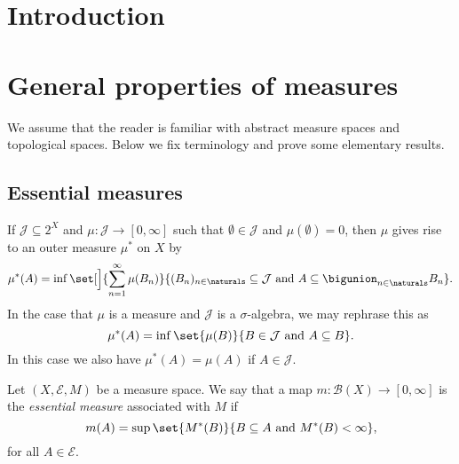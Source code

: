 \documentclass[article, a4paper, 11pt, oneside]{memoir}
\title{\doctitle}
\author{\docauthor}
\numberwithin{equation}{chapter}
\newcommand{\calB}{\mathcal{B}}
\newcommand{\calE}{\mathcal{E}}
\newcommand{\borel}[1]{\calB(#1)}
\begin{document}
\maketitle

\chapter{Introduction}


\chapter{General properties of measures}

We assume that the reader is familiar with abstract measure spaces and topological spaces. Below we fix terminology and prove some elementary results.


\section{Essential measures}

\newcommand{\calJ}{\mathcal{J}}
\newcommand{\powerset}[1]{2^{#1}}

If $\calJ \subseteq \powerset{X}$ and $\mu \colon \calJ \to [0,\infty]$ such that $\emptyset \in \calJ$ and $\mu(\emptyset) = 0$, then $\mu$ gives rise to an outer measure $\mu^*$ on $X$ by
%
\begin{equation*}
    \mu^*(A)
        = \inf \set[\Big]{
            \sum_{n=1}^\infty \mu(B_n)
        }{
            (B_n)_{n \in \naturals} \subseteq \calJ
            \text{ and }
            A \subseteq \bigunion_{n \in \naturals} B_n
        }.
\end{equation*}
%
In the case that $\mu$ is a measure and $\calJ$ is a $\sigma$-algebra, we may rephrase this as
%
\begin{equation*}
    \mu^*(A)
        = \inf \set{
            \mu(B)
        }{
            B \in \calJ
            \text{ and }
            A \subseteq B
        }.
\end{equation*}
%
In this case we also have $\mu^*(A) = \mu(A)$ if $A \in \calJ$.

\begin{definition}
    Let $(X, \calE, M)$ be a measure space. We say that a map $m \colon \borel{X} \to [0,\infty]$ is the \emph{essential measure} associated with $M$ if
    \begin{equation*}
        m(A)
            = \sup \set{ M^*(B) }{ B \subseteq A \text{ and } M^*(B) < \infty },
    \end{equation*}
    for all $A \in \calE$.
\end{definition}
\end{document}
